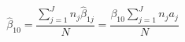 \begin{equation}
\hat{\beta}_{10} = \frac{\sum\limits_{j=1}^J n_j\hat{\beta}_{1j}}{N} = \frac{\beta_{10}\sum\limits_{j=1}^J n_j a_j}{N} 
\end{equation}